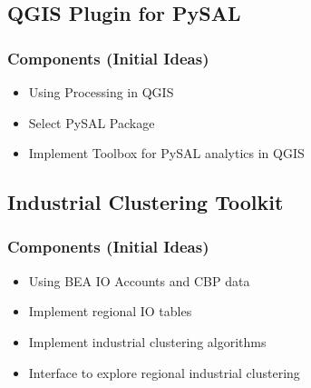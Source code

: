 \documentclass[12pt]{article}
\begin{document}
\subsection*{QGIS Plugin for PySAL}
\label{sec:org153438a}
\subsubsection*{Components (Initial Ideas)}
\label{sec:org270bba4}
\begin{itemize}
\item Using Processing in QGIS
\item Select PySAL Package
\item Implement Toolbox for PySAL analytics in QGIS
\end{itemize}
\subsection*{Industrial Clustering Toolkit}
\label{sec:org4cca0d1}
\subsubsection*{Components (Initial Ideas)}
\label{sec:org64a946f}
\begin{itemize}
\item Using BEA IO Accounts and CBP data
\item Implement regional IO tables
\item Implement industrial clustering algorithms
\item Interface to explore regional industrial clustering
\end{itemize}
\end{document}
